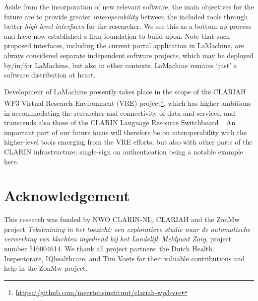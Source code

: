 \documentclass[a4paper,11pt]{article}
\begin{document}
Aside from the incorporation of new relevant software, the main objectives for the future are to provide
greater \emph{interoperability} between the included tools through better \emph{high-level interfaces} for the
researcher. We see this as a bottom-up process and have now established a firm foundation to build upon. Note that such
proposed interfaces, including the current portal application in LaMachine, are always considered separate independent
software projects, which may be deployed by/in/for LaMachine, but also in other contexts. LaMachine remains `just'
a software distribution at heart.

Development of LaMachine presently takes place in the scope of the CLARIAH WP3 Virtual Research Environment (VRE)
project\footnote{\url{https://github.com/meertensinstituut/clariah-wp3-vre}}, which has higher ambitions in
accommodating the researcher and connectivity of data and services, and transcends also those of the CLARIN Language
Resource Switchboard~\cite{switchboard}. An important part of our future focus will therefore be on interoperability
with the higher-level tools emerging from the VRE efforts, but also with other parts of the CLARIN infrastructure;
single-sign on authentication being a notable example here.

\section*{Acknowledgement}

This research was funded by NWO CLARIN-NL, CLARIAH and the ZonMw project {\it Tekstmining in het toezicht: een exploratieve studie naar de automatische verwerking van klachten ingediend bij het Landelijk Meldpunt Zorg}, project number 516004614. We thank all project partners: the Dutch Health Inspectorate, IQhealthcare, and Tim Voets for their valuable contributions and help in the ZonMw project.



\end{document}
